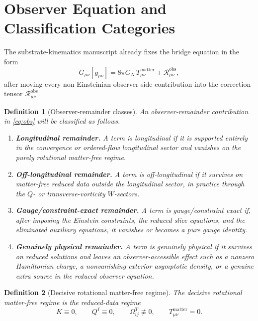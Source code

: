 \documentclass[11pt]{article}
\newcommand{\ObserverMetric}{g_{\mu\nu}}
\newcommand{\ObsRem}{\mathcal R_{\mu\nu}^{\mathrm{obs}}}
\newtheorem{definition}{Definition}
\begin{document}
\section{Observer Equation and Classification Categories}

The substrate-kinematics manuscript already fixes the bridge equation in the form
\begin{equation}
G_{\mu\nu}[\ObserverMetric]
=
8\pi G_N\,T_{\mu\nu}^{\mathrm{matter}}
+ \ObsRem,
\label{eq:obs}
\end{equation}
after moving every non-Einsteinian observer-side contribution into the correction tensor \(\ObsRem\).

\begin{definition}[Observer-remainder classes]
An observer-remainder contribution in \eqref{eq:obs} will be classified as follows.
\begin{enumerate}
    \item \textbf{Longitudinal remainder.} A term is longitudinal if it is supported entirely in the convergence or ordered-flow longitudinal sector and vanishes on the purely rotational matter-free regime.
    \item \textbf{Off-longitudinal remainder.} A term is off-longitudinal if it survives on matter-free reduced data outside the longitudinal sector, in practice through the \(Q\)- or transverse-vorticity \(W\)-sectors.
    \item \textbf{Gauge/constraint-exact remainder.} A term is gauge/constraint exact if, after imposing the Einstein constraints, the reduced slice equations, and the eliminated auxiliary equations, it vanishes or becomes a pure gauge identity.
    \item \textbf{Genuinely physical remainder.} A term is genuinely physical if it survives on reduced solutions and leaves an observer-accessible effect such as a nonzero Hamiltonian charge, a nonvanishing exterior asymptotic density, or a genuine extra source in the reduced observer equation.
\end{enumerate}
\end{definition}

\begin{definition}[Decisive rotational matter-free regime]
The \emph{decisive rotational matter-free regime} is the reduced-data regime
\begin{equation}
K\equiv 0,
\qquad
Q^I\equiv 0,
\qquad
\Omega_{ij}^T\not\equiv 0,
\qquad
T_{\mu\nu}^{\mathrm{matter}}=0.
\label{eq:rot}
\end{equation}
\end{definition}
\end{document}
